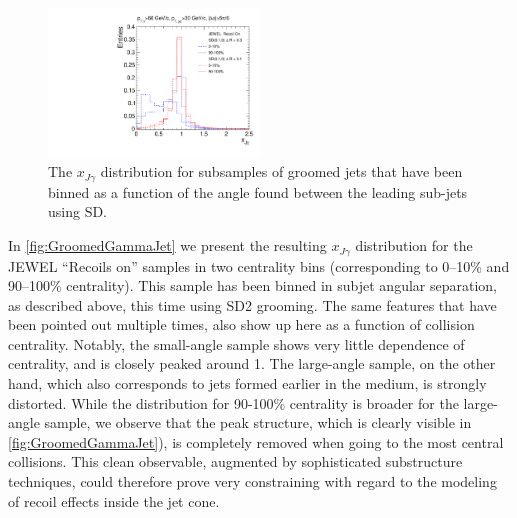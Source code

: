 \begin{figure}[th]
\centering
\includegraphics[width=0.5\textwidth]
{figures/Observables_GammaJet/JEWEL-photon-jet-recoilOn-linear}%
\caption{The $x_{J\gamma}$ distribution for subsamples of groomed jets that have been binned as a function of the angle found between the leading sub-jets using SD. }
\label{fig:GroomedGammaJet}
\end{figure}
In \autoref{fig:GroomedGammaJet} we present the resulting $x_{J\gamma}$ distribution for the JEWEL ``Recoils on'' samples in two centrality bins (corresponding to 0--10\% and 90--100\% centrality). This sample has been binned in subjet angular separation, as described above, this time using SD2 grooming. The same features that have been pointed out multiple times, also show up here as a function of collision centrality. Notably, the small-angle sample shows very little dependence of centrality, and is closely peaked around 1. The large-angle sample, on the other hand, which also corresponds to jets formed earlier in the medium, is strongly distorted. While the distribution for  90-100\% centrality is broader for the large-angle sample, we observe that the peak structure, which is clearly visible in \autoref{fig:GroomedGammaJet}), is completely removed when going to the most central collisions. This clean observable, augmented by sophisticated substructure techniques, could therefore prove very constraining with regard to the modeling of recoil effects inside the jet cone.

